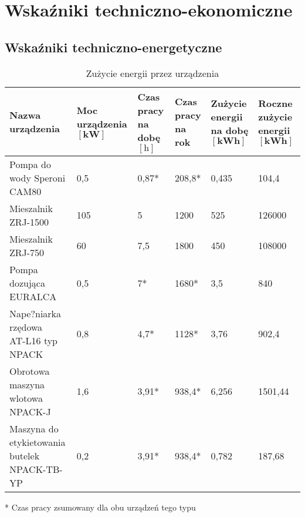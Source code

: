 \section{Wskaźniki techniczno-ekonomiczne}

\subsection{Wskaźniki techniczno-energetyczne}

\begin{table}[h]
	\centering
	\caption{Zużycie energii przez urządzenia}
	\begin{tabular}{*{6}{l}}
		\hline
		\makecell[l]{\textbf{Nazwa} \\ \textbf{urządzenia}} & \makecell[l]{\textbf{Moc urządzenia} \\ $[\mathrm{\mathbf{kW}}]$} & \makecell[l]{\textbf{Czas pracy} \\ \textbf{na dobę} $[\mathbf{\mathrm{h}}]$} & \makecell[l]{\textbf{Czas pracy} \\ \textbf{na rok}} & \makecell[l]{\textbf{Zużycie energii} \\ \textbf{na dobę} $[\mathrm{\mathbf{kWh}}]$} & \makecell[l]{\textbf{Roczne zużycie} \\ \textbf{energii} $[\mathrm{\mathbf{kWh}}]$} \\
		\hline\hline
		Pompa do wody \textsf{Speroni CAM80} & 0,5 & 0,87* & 208,8* & 0,435 & 104,4 \\
		Mieszalnik \textsf{ZRJ-1500} & 105 & 5 & 1200 & 525 & 126000 \\
		Mieszalnik \textsf{ZRJ-750} & 60 & 7,5 & 1800 & 450 & 108000 \\
		Pompa dozująca \textsf{EURALCA} & 0,5 & 7* & 1680* & 3,5 & 840 \\
		\makecell[l]{Nape?niarka rzędowa \\ \textsf{AT-L16 typ NPACK}} & 0,8 & 4,7* & 1128* & 3,76 & 902,4 \\
		\makecell[l]{Obrotowa maszyna wlotowa \\ \textsf{NPACK-J}} & 1,6 & 3,91* & 938,4* & 6,256 & 1501,44 \\
		\makecell[l]{Maszyna do \\ etykietowania butelek \textsf{NPACK-TB-YP}} & 0,2 & 3,91* & 938,4* & 0,782 & 187,68 \\
		\hline
	\end{tabular}
\end{table}

* Czas pracy zsumowany dla obu urządzeń tego typu


